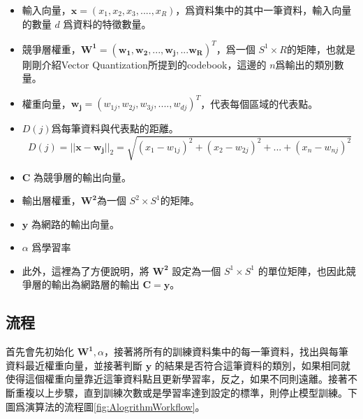 \begin{itemize}
	\item
	      輸入向量，\(\mathbf{x} = (x_1,x_2,x_3,....,x_R)\)，爲資料集中的其中一筆資料，輸入向量的數量 \(d\) 爲資料的特徵數量。


	\item
	      競爭層權重，\(\mathbf{W^1} = (\mathbf{w_1,w_2,...,w_j,...w_R})^T\)，爲一個 \(S^1 \times R \)的矩陣，也就是剛剛介紹Vector Quantization所提到的codebook，這邊的 \(n\)爲輸出的類別數量。
	\item
		權重向量，\(\mathbf{w_{j}} = (w_{1j},w_{2j},w_{3j},....,w_{dj})^T\)，代表每個區域的代表點。

	\item
	      \(D(j)\)爲每筆資料與代表點的距離。
	      $$D(j)=||\mathbf{x}-\mathbf{w_j}||_2 = \sqrt{(x_1-w_{1j})^2+(x_2-w_{2j})^2+...+(x_n-w_{nj})^2} $$


	\item
		\(\mathbf{C}\) 為競爭層的輸出向量。

	\item
	      輸出層權重，\(\mathbf{W^2} \)為一個 \(S^2 \times S^1\)的矩陣。

	\item
		\(\mathbf{y}\) 為網路的輸出向量。

	\item
	      \(\alpha\) 爲學習率
	\item
		此外，這裡為了方便說明，將 \(\mathbf{W^2}\) 設定為一個 \(S^1 \times S^1\) 的單位矩陣，也因此競爭層的輸出為網路層的輸出 \(\mathbf{C} = \mathbf{y}\)。

\end{itemize}


\subsection{流程}

首先會先初始化 \(\mathbf{W^1},\alpha\)，接著將所有的訓練資料集中的每一筆資料，找出與每筆資料最近權重向量，並接著判斷 \(\mathbf{y}\) 的結果是否符合這筆資料的類別，如果相同就使得這個權重向量靠近這筆資料點且更新學習率，反之，如果不同則遠離。接著不斷重複以上步驟，直到訓練次數或是學習率達到設定的標準，則停止模型訓練。下圖爲演算法的流程圖\ref{fig:AlogrithmWorkflow}。

\newpage

\usetikzlibrary{positioning, shapes.geometric}




